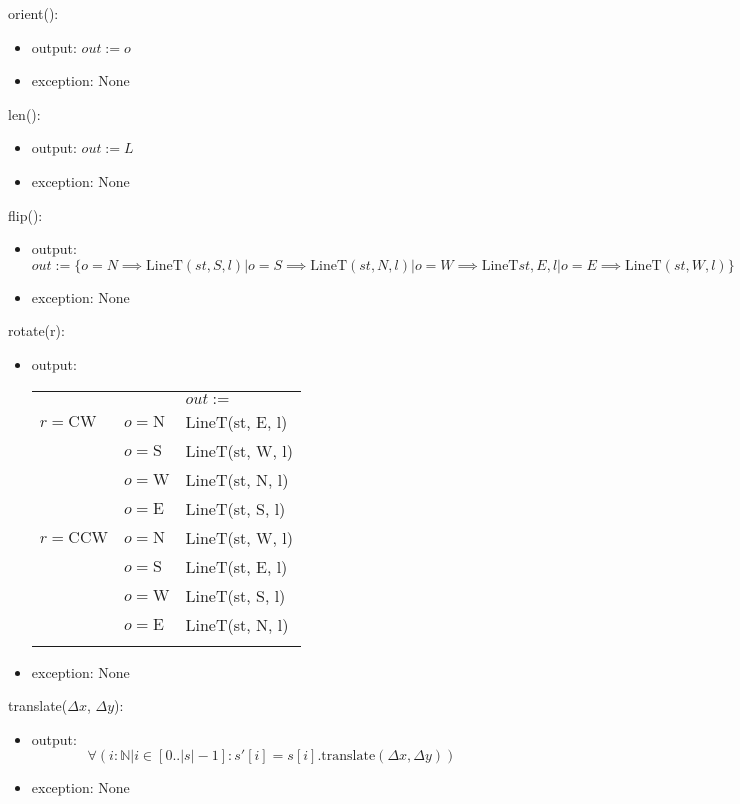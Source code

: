 \documentclass[12pt]{article}
\begin{document}
\noindent orient():
\begin{itemize}
\item output: $out := o$
\item exception: None
\end{itemize}

\noindent len():
\begin{itemize}
\item output: $out := L$
\item exception: None
\end{itemize}

\noindent flip():
\begin{itemize}
\item output: $out := \{o = N \implies \mbox{LineT}(st, S, l)|o = S \implies \mbox{LineT}(st, N, l)|o = W \implies \mbox{LineT}{st, E, l}|o = E \implies \mbox{LineT}(st, W, l)\}$
\item exception: None
\end{itemize}

\noindent rotate(r):
\begin{itemize}
\item output: 
\begin{tabular}{|p{}|p{2.3cm}|l|}
\hhline{~|~|-|}
\multicolumn{1}{r}{} & \multicolumn{1}{r|}{} & \multicolumn{1}{l|}{$out :=$}\\
\hhline{|-|-|-|}
$r = \mbox{CW}$ & $o = \mbox{N}$ & LineT(st, E, l)\\
\hhline{|~|-|-|}
~ & $o = \mbox{S}$ & LineT(st, W, l)\\
\hhline{|~|-|-|}
~ & $o = \mbox{W}$ & LineT(st, N, l)\\
\hhline{|~|-|-|}
~ & $o = \mbox{E}$ & LineT(st, S, l)\\
\hhline{-|-|-|}
$r = \mbox{CCW}$ & $o = \mbox{N}$ & LineT(st, W, l)\\
\hhline{|~|-|-|}
~ & $o = \mbox{S}$ & LineT(st, E, l)\\
\hhline{|~|-|-|}
~ & $o = \mbox{W}$ & LineT(st, S, l)\\
\hhline{|~|-|-|}
~ & $o = \mbox{E}$ & LineT(st, N, l)\\
\hhline{-|-|-|}
\end{tabular}

\item exception: None
\end{itemize}

\noindent translate($\Delta x$, $\Delta y$):
\begin{itemize}
\item output: $$\forall(i: \mathbb{N} | i \in [0..|s|-1] : s'[i] = s[i].\mbox{translate}(\Delta x, \Delta y))$$
\item exception: None
\end{itemize}
\end{document}
